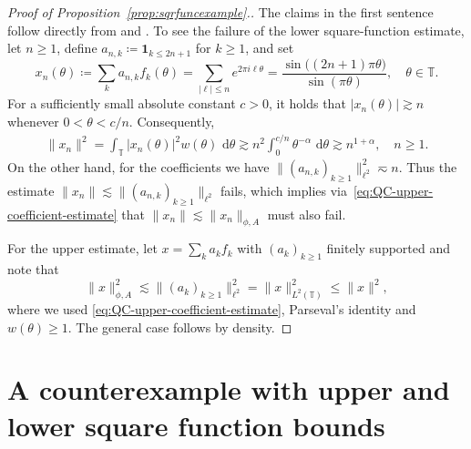 \documentclass[11pt]{amsart}
\theoremstyle{definition}
\theoremstyle{remark}
\numberwithin{equation}{section}
\newcommand{\1}{\mathbf 1}
\newcommand{\norm}[1]{\lVert #1\rVert}
\newcommand{\abs}[1]{\lvert #1\rvert}
\newcommand{\dd}{\,\mathrm d}
\newcommand{\one}{\1}
\begin{document}
\begin{proof}[Proof of Proposition~\ref{prop:sqrfuncexample}.]
    The claims in the first sentence follow directly from \cite[Lemmas~9.1.1 and 9.1.2]{Haase2006} and \cite[Proposition 10.2.28]{HNVW2017}.
    To see the failure of the lower square-function estimate, let $n \geq 1$, define $a_{n,k} \coloneq \one_{k \leq 2n+1}$ for $k \geq 1$, and set
    \begin{equation}
        x_n(\theta) \coloneq \sum_k a_{n,k} f_k(\theta) = \sum_{\abs{\ell} \leq n} e^{2 \pi i \ell \theta} = \frac{\sin\big((2n+1)\pi \theta \big)}
     {\sin(\pi \theta)}, \quad \theta \in \mathbb{T}.
    \end{equation}
    For a sufficiently small absolute constant $c>0$,
    it holds that $|x_n(\theta)|\gtrsim n$ whenever $0<\theta <c/n$.
    Consequently,
    \begin{align}\label{eq:normxn}
     \|x_n\|^2
     =
     \int_{\mathbb T}|x_n(\theta) |^2w(\theta)\,\dd \theta
     \gtrsim
     n^2\int_0^{c/n}\theta^{-\alpha}\,\dd\theta
     \gtrsim n^{1+\alpha}, \quad n \geq 1.
    \end{align}
    On the other hand, for the coefficients we have $\norm{(a_{n,k})_{k \geq 1}}_{\ell^2}^2 \eqsim n$.
    Thus the estimate $\norm{x_n} \lesssim \norm{(a_{n,k})_{k \geq 1}}_{\ell^2}$ fails, which implies via~\eqref{eq:QC-upper-coefficient-estimate} that $\norm{x_n} \lesssim \norm{x_n}_{\phi,A}$ must also fail.

    For the upper estimate, let $x = \sum_k a_k f_k$ with $(a_k)_{k\geq 1}$ finitely supported and note that
\[\norm{x}_{\phi,A}^2 
    \lesssim \norm{(a_k)_{k \geq 1}}_{\ell^2}^2 = \norm{x}_{L^2(\mathbb T)}^2 \leq \|x\|^2,\]
    where  we used \eqref{eq:QC-upper-coefficient-estimate}, Parseval's identity and $w(\theta)\geq 1$. The general case follows by density. 
\end{proof}



\section{A counterexample with upper and lower square function bounds}
\label{sec:endpoint-calculus}
\end{document}
